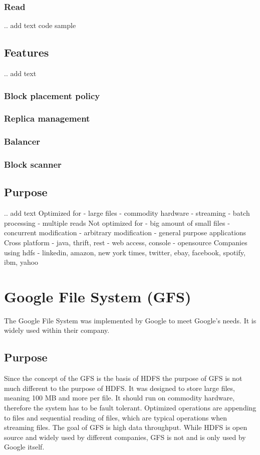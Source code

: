 \documentclass{sig-alternate}
\begin{document}
\subsubsection{Read}
.. add text code sample

\subsection{Features}
.. add text
\subsubsection{Block placement policy}
\subsubsection{Replica management}
\subsubsection{Balancer}
\subsubsection{Block scanner}

\subsection{Purpose}
.. add text
Optimized for
- large files
- commodity hardware
- streaming
- batch processing
- multiple reads
Not optimized for
- big amount of small files
- concurrent modification
- arbitrary modification
- general purpose applications
Cross platform
- java, thrift, rest
- web access, console
- opensource
Companies using hdfs
- linkedin, amazon, new york times, twitter, ebay, facebook, spotify, ibm, yahoo


\section{Google File System (GFS)}
The Google File System was implemented by Google to meet Google's needs. It is widely used within their company.
\subsection{Purpose}
Since the concept of the GFS is the basis of HDFS the purpose of GFS is not much different to the purpose of HDFS. It was designed to store large files, meaning 100 MB and more per file. It should run on commodity hardware, therefore the system has to be fault tolerant. Optimized operations are appending to files and sequential reading of files, which are typical operations when streaming files. The goal of GFS is high data throughput.
While HDFS is open source and widely used by different companies, GFS is not and is only used by Google itself.
\end{document}
